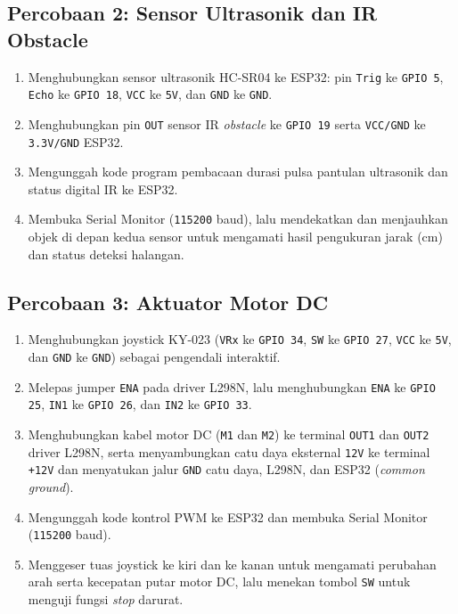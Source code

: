 \subsection{Percobaan 2: Sensor Ultrasonik dan IR Obstacle}
\begin{enumerate}
    \item Menghubungkan sensor ultrasonik HC-SR04 ke ESP32: pin \texttt{Trig} ke \texttt{GPIO 5}, \texttt{Echo} ke \texttt{GPIO 18}, \texttt{VCC} ke \texttt{5V}, dan \texttt{GND} ke \texttt{GND}.
    \item Menghubungkan pin \texttt{OUT} sensor IR \textit{obstacle} ke \texttt{GPIO 19} serta \texttt{VCC/GND} ke \texttt{3.3V/GND} ESP32.
    \item Mengunggah kode program pembacaan durasi pulsa pantulan ultrasonik dan status digital IR ke ESP32.
    \item Membuka Serial Monitor (\texttt{115200} baud), lalu mendekatkan dan menjauhkan objek di depan kedua sensor untuk mengamati hasil pengukuran jarak (cm) dan status deteksi halangan.
\end{enumerate}

\subsection{Percobaan 3: Aktuator Motor DC}
\begin{enumerate}
    \item Menghubungkan joystick KY-023 (\texttt{VRx} ke \texttt{GPIO 34}, \texttt{SW} ke \texttt{GPIO 27}, \texttt{VCC} ke \texttt{5V}, dan \texttt{GND} ke \texttt{GND}) sebagai pengendali interaktif.
    \item Melepas jumper \texttt{ENA} pada driver L298N, lalu menghubungkan \texttt{ENA} ke \texttt{GPIO 25}, \texttt{IN1} ke \texttt{GPIO 26}, dan \texttt{IN2} ke \texttt{GPIO 33}.
    \item Menghubungkan kabel motor DC (\texttt{M1} dan \texttt{M2}) ke terminal \texttt{OUT1} dan \texttt{OUT2} driver L298N, serta menyambungkan catu daya eksternal \texttt{12V} ke terminal \texttt{+12V} dan menyatukan jalur \texttt{GND} catu daya, L298N, dan ESP32 (\textit{common ground}).
    \item Mengunggah kode kontrol PWM ke ESP32 dan membuka Serial Monitor (\texttt{115200} baud).
    \item Menggeser tuas joystick ke kiri dan ke kanan untuk mengamati perubahan arah serta kecepatan putar motor DC, lalu menekan tombol \texttt{SW} untuk menguji fungsi \textit{stop} darurat.
\end{enumerate}

